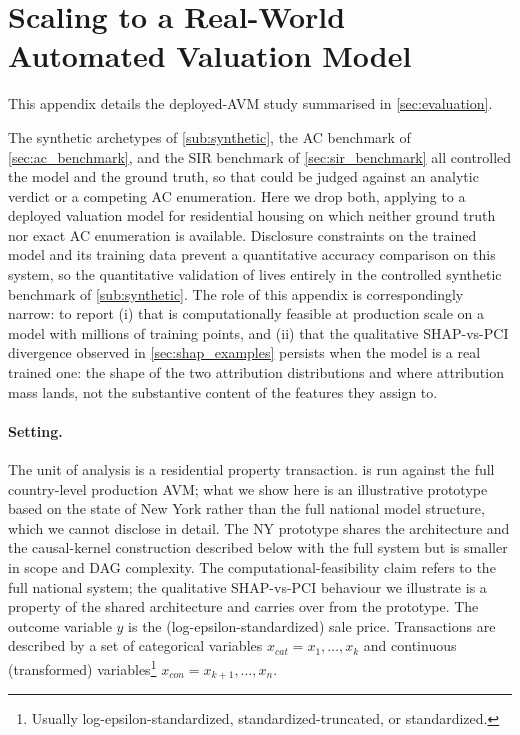 \section{Scaling \ourapproach to a Real-World Automated Valuation Model}\label{sec:avm}

 This appendix details the deployed-AVM study summarised in \cref{sec:evaluation}.

The synthetic archetypes of \cref{sub:synthetic}, the AC benchmark of
\cref{sec:ac_benchmark}, and the SIR benchmark of \cref{sec:sir_benchmark} all
controlled the model and the ground truth, so that \ourapproach could be judged
against an analytic verdict or a competing AC enumeration. Here we drop both,
applying \ourapproach to a deployed valuation model for residential housing on
which neither ground truth nor exact AC enumeration is available. Disclosure
constraints on the trained model and its training data prevent a quantitative
accuracy comparison on this system, so the quantitative validation of
\ourapproach{} lives entirely in the controlled synthetic benchmark of
\cref{sub:synthetic}. The role of this appendix is correspondingly narrow: to
report (i) that \ourapproach{} is computationally feasible at production scale on a
model with millions of training points, and (ii) that the qualitative SHAP-vs-PCI
divergence observed in \cref{sec:shap_examples} persists when the model is a real
trained one: the shape of the two attribution distributions and where
attribution mass lands, not the substantive content of the features they assign to.

\paragraph{Setting.}
The unit of analysis is a residential property transaction. \ourapproach is run
against the full country-level production AVM; what we show here is an
illustrative prototype based on the state of New York rather than
the full national model structure, which we cannot disclose in detail. The NY
prototype shares the architecture and the causal-kernel construction described
below with the full system but is smaller in scope and DAG complexity. The
computational-feasibility claim refers to the full national system; the
qualitative SHAP-vs-PCI behaviour we illustrate is a property of the shared
architecture and carries over from the prototype. The
outcome variable $y$ is the (log-epsilon-standardized) sale price. Transactions are
described by a set of categorical variables $x_{cat} = x_{1}, \dots, x_k$ and continuous
(transformed) variables\footnote{Usually log-epsilon-standardized,
standardized-truncated, or standardized.} $x_{con} = x_{k+1}, \dots, x_n$.

